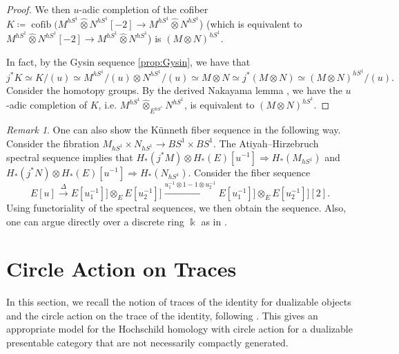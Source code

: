\documentclass[11pt]{amsart}
\numberwithin{equation}{section}
\theoremstyle{plain}
\theoremstyle{definition}
\theoremstyle{remark}
\newtheorem{RMK}[rmk]{Remark}
\begin{document}
\begin{proof}
    We then $u$-adic completion of the cofiber $K\coloneqq \operatorname{cofib}(M^{hS^1} \widehat\otimes N^{hS^1}[-2] \rightarrow M^{hS^1} \widehat\otimes N^{hS^1}$) (which is equivalent to $M^{hS^1} \widehat\otimes N^{hS^1}[-2] \rightarrow M^{hS^1} \widehat\otimes N^{hS^1}$) is $(M \otimes N)^{hS^1}$. 

In fact, by the Gysin sequence \autoref{prop:Gysin}, we have that
\[j^*K\simeq K/(u)\simeq M^{hS^1}/(u) \otimes N^{hS^1}/(u)\simeq M\otimes N \simeq j^*(M\otimes N )\simeq (M \otimes N)^{hS^1}/(u).\]
Consider the homotopy groups. By the derived Nakayama lemma \cite[Tag 0G1U]{StacksProject}, we have the $u$-adic completion of $K$, i.e. $M^{hS^1} \widehat\otimes_{E^{hS^1}} N^{hS^1}$, is equivalent to $(M \otimes N)^{hS^1}$.
\end{proof}

\begin{RMK}    
    One can also show the K\"unneth fiber sequence in the following way. Consider the fibration $M_{hS^1} \times N_{hS^1} \rightarrow BS^1 \times BS^1$. The Atiyah–Hirzebruch spectral sequence implies that $H_*(j^*M) \otimes H_*(E)[u^{-1}] \Rightarrow H_*(M_{hS^1})$ and $H_*(j^*N) \otimes H_*(E)[u^{-1}] \Rightarrow H_*(N_{hS^1})$. Consider the fiber sequence 
    \begin{equation}E[u] \xrightarrow{\Delta} E[u_1^{-1}]] \otimes_E E[u_2^{-1}]] \xrightarrow{u_1^{-1} \otimes 1 - 1 \otimes u_2^{-1}} E[u_1^{-1}]] \otimes_E E[u_2^{-1}]] [2].\end{equation}
    Using functoriality of the spectral sequences, we then obtain the sequence. Also, one can argue directly over a discrete ring $\Bbbk$ as in \cite[Theorem 4.3.11]{LodayCyclic}.
\end{RMK}







\section{Circle Action on Traces}\label{sec:trace}

In this section, we recall the notion of traces of the identity for dualizable objects and the circle action on the trace of the identity, following \cite{Hoyois-Scherotzke-Sibilla,Ayala-Francis-FH-dim1}. This gives an appropriate model for the Hochschild homology with circle action for a dualizable presentable category that are not necessarily compactly generated.
\end{document}
